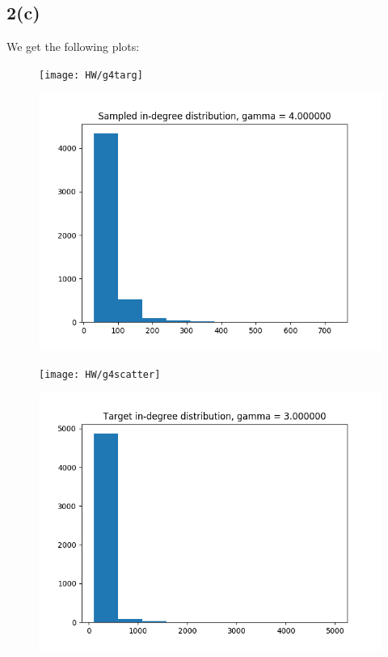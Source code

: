 \documentclass[11pt]{article}
\begin{document}
\subsection*{2(c)} We get the following plots:
\begin{figure}[H]
\texttt{[image: HW/g4targ]}
\label{fig:g4targ}	
\end{figure}
\begin{figure}[H]
	\includegraphics[scale=0.7]{HW/g4sample}
	\label{fig:g4sample}	
\end{figure}
\begin{figure}[H]
	\texttt{[image: HW/g4scatter]}
	\label{fig:g4scatter}	
\end{figure}
\begin{figure}[H]
	\includegraphics[scale=0.7]{HW/g3targ}
	\label{fig:g3targ}	
\end{figure}
\end{document}
